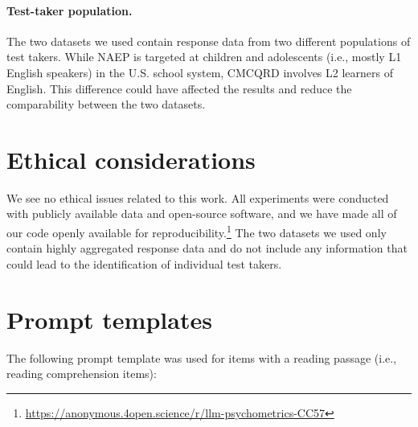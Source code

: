 \documentclass[11pt]{article}
\begin{document}
\paragraph{Test-taker population.}
The two datasets we used contain response data from two different populations of test takers. While NAEP is targeted at children and adolescents (i.e., mostly L1 English speakers) in the U.S. school system, CMCQRD involves L2 learners of English. This difference could have affected the results and reduce the comparability between the two datasets.

\section*{Ethical considerations}

We see no ethical issues related to this work. All experiments were conducted with publicly available data and open-source software, and we have made all of our code openly available for reproducibility.\footnote{\url{https://anonymous.4open.science/r/llm-psychometrics-CC57}} The two datasets we used only contain highly aggregated response data and do not include any information that could lead to the identification of individual test takers.





\onecolumn
\appendix

\section{Prompt templates}
\label{sec:appendix-prompt}

The following prompt template was used for items with a reading passage (i.e., reading comprehension items):

\noindent{}
\end{document}
